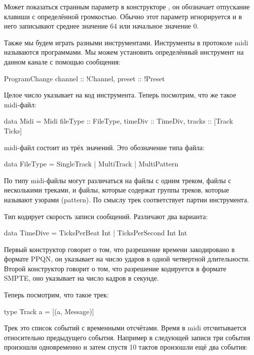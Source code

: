 Может показаться странным параметр  в конструкторе
, он обозначает отпускание клавиши с определённой
громкостью. Обычно этот параметр игнорируется и в него записывают
среднее значение 64 или начальное значение 0.

Также мы будем играть разными инструментами. Инструменты
в протоколе midi называются программами. Мы можем установить
определённый инструмент на данном канале с помощью сообщения:

\begin{code}
ProgramChange {
    channel :: !Channel,
    preset  :: !Preset }
\end{code}

Целое число  указывает на код инструмента.
Теперь посмотрим, что же такое midi-файл:

\begin{code}
data Midi = Midi {
    fileType :: FileType,
    timeDiv  :: TimeDiv,
    tracks   :: [Track Ticks] }
\end{code}

midi-файл состоит из трёх значений. Это обозначение типа файла:

\begin{code}
data FileType = SingleTrack | MultiTrack | MultiPattern
\end{code}

По типу midi-файлы могут различаться на файлы с одним треком,
файлы с несколькими треками, и файлы, которые содержат группы
треков, которые называют узорами (pattern). По смыслу трек
соответствует партии инструмента.

Тип  кодирует скорость записи сообщений.
Различают два варианта:

\begin{code}
data TimeDive = TicksPerBeat Int 
              | TicksPerSecond Int Int
\end{code}

Первый конструктор говорит о том, что разрешение времени
закодировано в формате PPQN, он указывает на число 
ударов в одной четвертной длительности. Второй
конструктор говорит о том, что разрешение кодируется в 
формате SMPTE, оно указывает на число кадров в секунде. 

Теперь посмотрим, что такое трек:

\begin{code}
type Track a = [(a, Message)]
\end{code}

Трек это список событий с временными отсчётами.
Время в midi отсчитывается относительно предыдущего события.
Например в следующей записи три события произошли одновременно
и затем спустя 10 тактов произошли ещё два события:

